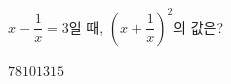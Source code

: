 $x-\dfrac{1}{x}=3$일 때, $\left(x+\dfrac{1}{x}\right)^2$의 값은?
\begin{choices32}{$7$}{$8$}{$10$}{$13$}{$15$}\end{choices32}
